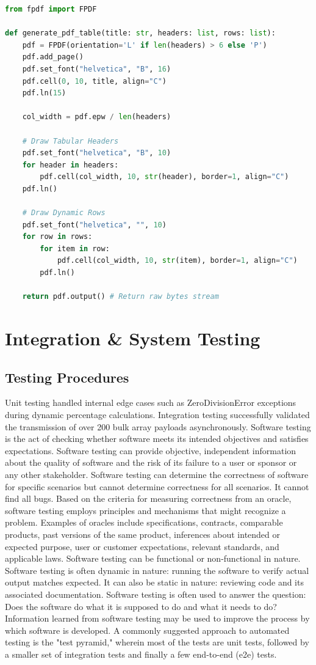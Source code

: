 \documentclass[12pt,a4paper]{report}
\begin{document}
\begin{lstlisting}[language=Python, caption=Dynamic PDF Bytearray Streaming Implementation]
from fpdf import FPDF

def generate_pdf_table(title: str, headers: list, rows: list):
    pdf = FPDF(orientation='L' if len(headers) > 6 else 'P')
    pdf.add_page()
    pdf.set_font("helvetica", "B", 16)
    pdf.cell(0, 10, title, align="C")
    pdf.ln(15)
    
    col_width = pdf.epw / len(headers)
    
    # Draw Tabular Headers
    pdf.set_font("helvetica", "B", 10)
    for header in headers:
        pdf.cell(col_width, 10, str(header), border=1, align="C")
    pdf.ln()
    
    # Draw Dynamic Rows
    pdf.set_font("helvetica", "", 10)
    for row in rows:
        for item in row:
            pdf.cell(col_width, 10, str(item), border=1, align="C")
        pdf.ln()
        
    return pdf.output() # Return raw bytes stream
\end{lstlisting}

\section{Integration \& System Testing}
\subsection{Testing Procedures}
Unit testing handled internal edge cases such as ZeroDivisionError exceptions during dynamic percentage calculations. Integration testing successfully validated the transmission of over 200 bulk array payloads asynchronously.
Software testing is the act of checking whether software meets its intended objectives and satisfies expectations.
Software testing can provide objective, independent information about the quality of software and the risk of its failure to a user or sponsor or any other stakeholder.
Software testing can determine the correctness of software for specific scenarios but cannot determine correctness for all scenarios. It cannot find all bugs.
Based on the criteria for measuring correctness from an oracle, software testing employs principles and mechanisms that might recognize a problem. Examples of oracles include specifications, contracts, comparable products, past versions of the same product, inferences about intended or expected purpose, user or customer expectations, relevant standards, and applicable laws.
Software testing can be functional or non-functional in nature.
Software testing is often dynamic in nature: running the software to verify actual output matches expected. It can also be static in nature: reviewing code and its associated documentation.
Software testing is often used to answer the question: Does the software do what it is supposed to do and what it needs to do?
Information learned from software testing may be used to improve the process by which software is developed.
A commonly suggested approach to automated testing is the "test pyramid," wherein most of the tests are unit tests, followed by a smaller set of integration tests and finally a few end-to-end (e2e) tests.
\end{document}
